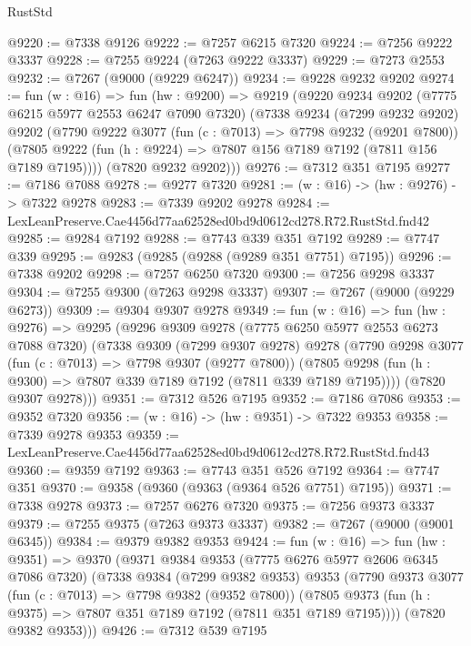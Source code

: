 \begin{lexlean}{RustStd}
\begin{coremodule}
@9220 := @7338 @9126
@9222 := @7257 @6215 @7320
@9224 := @7256 @9222 @3337
@9228 := @7255 @9224 (@7263 @9222 @3337)
@9229 := @7273 @2553
@9232 := @7267 (@9000 (@9229 @6247))
@9234 := @9228 @9232 @9202
@9274 := fun (w : @16) =>
  fun (hw : @9200) =>
  @9219
    (@9220
      @9234
      @9202
      (@7775 @6215 @5977 @2553 @6247 @7090 @7320)
      (@7338
        @9234
        (@7299 @9232 @9202)
        @9202
        (@7790
          @9222
          @3077
          (fun (c : @7013) => @7798 @9232 (@9201 @7800))
          (@7805 @9222 (fun (h : @9224) => @7807 @156 @7189 @7192 (@7811 @156 @7189 @7195))))
        (@7820 @9232 @9202)))
@9276 := @7312 @351 @7195
@9277 := @7186 @7088
@9278 := @9277 @7320
@9281 := (w : @16) -> (hw : @9276) -> @7322 @9278
@9283 := @7339 @9202 @9278
@9284 := LexLeanPreserve.Cae4456d77aa62528ed0bd9d0612cd278.R72.RustStd.fnd42
@9285 := @9284 @7192
@9288 := @7743 @339 @351 @7192
@9289 := @7747 @339
@9295 := @9283 (@9285 (@9288 (@9289 @351 @7751) @7195))
@9296 := @7338 @9202
@9298 := @7257 @6250 @7320
@9300 := @7256 @9298 @3337
@9304 := @7255 @9300 (@7263 @9298 @3337)
@9307 := @7267 (@9000 (@9229 @6273))
@9309 := @9304 @9307 @9278
@9349 := fun (w : @16) =>
  fun (hw : @9276) =>
  @9295
    (@9296
      @9309
      @9278
      (@7775 @6250 @5977 @2553 @6273 @7088 @7320)
      (@7338
        @9309
        (@7299 @9307 @9278)
        @9278
        (@7790
          @9298
          @3077
          (fun (c : @7013) => @7798 @9307 (@9277 @7800))
          (@7805 @9298 (fun (h : @9300) => @7807 @339 @7189 @7192 (@7811 @339 @7189 @7195))))
        (@7820 @9307 @9278)))
@9351 := @7312 @526 @7195
@9352 := @7186 @7086
@9353 := @9352 @7320
@9356 := (w : @16) -> (hw : @9351) -> @7322 @9353
@9358 := @7339 @9278 @9353
@9359 := LexLeanPreserve.Cae4456d77aa62528ed0bd9d0612cd278.R72.RustStd.fnd43
@9360 := @9359 @7192
@9363 := @7743 @351 @526 @7192
@9364 := @7747 @351
@9370 := @9358 (@9360 (@9363 (@9364 @526 @7751) @7195))
@9371 := @7338 @9278
@9373 := @7257 @6276 @7320
@9375 := @7256 @9373 @3337
@9379 := @7255 @9375 (@7263 @9373 @3337)
@9382 := @7267 (@9000 (@9001 @6345))
@9384 := @9379 @9382 @9353
@9424 := fun (w : @16) =>
  fun (hw : @9351) =>
  @9370
    (@9371
      @9384
      @9353
      (@7775 @6276 @5977 @2606 @6345 @7086 @7320)
      (@7338
        @9384
        (@7299 @9382 @9353)
        @9353
        (@7790
          @9373
          @3077
          (fun (c : @7013) => @7798 @9382 (@9352 @7800))
          (@7805 @9373 (fun (h : @9375) => @7807 @351 @7189 @7192 (@7811 @351 @7189 @7195))))
        (@7820 @9382 @9353)))
@9426 := @7312 @539 @7195

\end{coremodule}
\end{lexlean}
